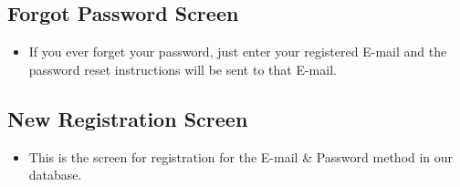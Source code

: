\documentclass{report}
\begin{document}
\pagebreak

\subsection{Forgot Password Screen}
\begin{itemize}
\item If you ever forget your password, just enter your registered E-mail and the password reset instructions will be sent to that E-mail.
\end{itemize}


\subsection{New Registration Screen}
\begin{itemize}
\item This is the screen for registration for the E-mail \& Password method in our database.
\end{itemize}
\end{document}
